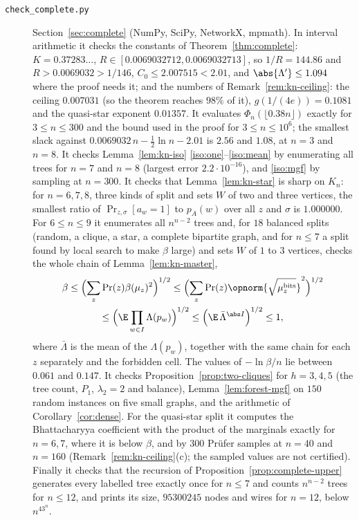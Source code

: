 \begin{description}
\item[\texttt{check\_complete.py}] Section~\ref{sec:complete} (NumPy, SciPy, NetworkX, mpmath). In interval arithmetic it checks the constants of Theorem~\ref{thm:complete}: $K=0.37283\ldots$, $R\in[0.0069032712,0.0069032713]$, so $1/R=144.86$ and $R>0.0069032>1/146$, $C_0\le2.007515<2.01$, and $\abs{\Lambda'}\le1.094$ where the proof needs it; and the numbers of Remark~\ref{rem:kn-ceiling}: the ceiling $0.007031$ (so the theorem reaches $98\%$ of it), $g(1/(4e))=0.1081$ and the quasi-star exponent $0.01357$. It evaluates $\Phi_n(\lfloor0.38n\rfloor)$ exactly for $3\le n\le300$ and the bound used in the proof for $3\le n\le10^6$; the smallest slack against $0.0069032\,n-\frac12\ln n-2.01$ is $2.56$ and $1.08$, at $n=3$ and $n=8$. It checks Lemma~\ref{lem:kn-iso} \ref{iso:one}--\ref{iso:mean} by enumerating all trees for $n=7$ and $n=8$ (largest error $2.2\cdot10^{-16}$), and \ref{iso:mgf} by sampling at $n=300$. It checks that Lemma~\ref{lem:kn-star} is sharp on $K_n$: for $n=6,7,8$, three kinds of split and sets $W$ of two and three vertices, the smallest ratio of $\Pr_{z,\sigma}[a_w=1]$ to $p_A(w)$ over all $z$ and $\sigma$ is $1.000000$. For $6\le n\le9$ it enumerates all $n^{n-2}$ trees and, for $18$ balanced splits (random, a clique, a star, a complete bipartite graph, and for $n\le7$ a split found by local search to make $\beta$ large) and sets $W$ of $1$ to $3$ vertices, checks the whole chain of Lemma~\ref{lem:kn-master},
\begin{multline*}
  \beta\le\Bigl(\sum_z\Pr(z)\beta(\mu_z)^2\Bigr)^{1/2}\le\Bigl(\sum_z\Pr(z)\opnorm{\sqrt{\mu_z^{\mathrm{bits}}}}^2\Bigr)^{1/2}\\
  \le\Bigl(\E\prod_{w\in I}\Lambda(p_w)\Bigr)^{1/2}\le\Bigl(\E\,\bar\Lambda^{\abs I}\Bigr)^{1/2}\le1,
\end{multline*}
where $\bar\Lambda$ is the mean of the $\Lambda(p_w)$, together with the same chain for each $z$ separately and the forbidden cell. The values of $-\ln\beta/n$ lie between $0.061$ and $0.147$. It checks Proposition~\ref{prop:two-cliques} for $h=3,4,5$ (the tree count, $P_1$, $\lambda_2=2$ and balance), Lemma~\ref{lem:forest-mgf} on $150$ random instances on five small graphs, and the arithmetic of Corollary~\ref{cor:dense}. For the quasi-star split it computes the Bhattacharyya coefficient with the product of the marginals exactly for $n=6,7$, where it is below $\beta$, and by $300$ Pr\"ufer samples at $n=40$ and $n=160$ (Remark~\ref{rem:kn-ceiling}(c); the sampled values are not certified). Finally it checks that the recursion of Proposition~\ref{prop:complete-upper} generates every labelled tree exactly once for $n\le7$ and counts $n^{n-2}$ trees for $n\le12$, and prints its size, $95300245$ nodes and wires for $n=12$, below $n^43^n$.


\end{description}
